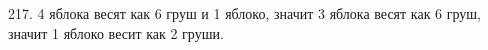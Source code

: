 217. 4 яблока весят как 6 груш и 1 яблоко, значит 3 яблока весят как 6 груш, значит 1 яблоко весит как 2 груши.\\
